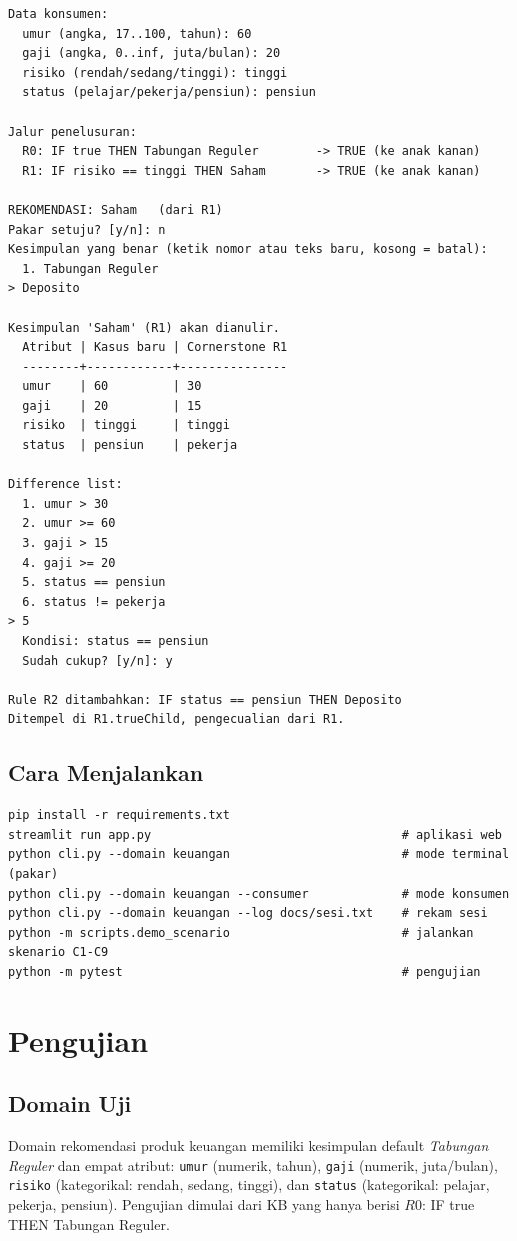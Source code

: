 \documentclass[11pt,a4paper]{article}
\begin{document}
\begin{lstlisting}
Data konsumen:
  umur (angka, 17..100, tahun): 60
  gaji (angka, 0..inf, juta/bulan): 20
  risiko (rendah/sedang/tinggi): tinggi
  status (pelajar/pekerja/pensiun): pensiun

Jalur penelusuran:
  R0: IF true THEN Tabungan Reguler        -> TRUE (ke anak kanan)
  R1: IF risiko == tinggi THEN Saham       -> TRUE (ke anak kanan)

REKOMENDASI: Saham   (dari R1)
Pakar setuju? [y/n]: n
Kesimpulan yang benar (ketik nomor atau teks baru, kosong = batal):
  1. Tabungan Reguler
> Deposito

Kesimpulan 'Saham' (R1) akan dianulir.
  Atribut | Kasus baru | Cornerstone R1
  --------+------------+---------------
  umur    | 60         | 30
  gaji    | 20         | 15
  risiko  | tinggi     | tinggi
  status  | pensiun    | pekerja

Difference list:
  1. umur > 30
  2. umur >= 60
  3. gaji > 15
  4. gaji >= 20
  5. status == pensiun
  6. status != pekerja
> 5
  Kondisi: status == pensiun
  Sudah cukup? [y/n]: y

Rule R2 ditambahkan: IF status == pensiun THEN Deposito
Ditempel di R1.trueChild, pengecualian dari R1.
\end{lstlisting}

\subsection{Cara Menjalankan}
\begin{lstlisting}
pip install -r requirements.txt
streamlit run app.py                                   # aplikasi web
python cli.py --domain keuangan                        # mode terminal (pakar)
python cli.py --domain keuangan --consumer             # mode konsumen
python cli.py --domain keuangan --log docs/sesi.txt    # rekam sesi
python -m scripts.demo_scenario                        # jalankan skenario C1-C9
python -m pytest                                       # pengujian
\end{lstlisting}

\section{Pengujian}

\subsection{Domain Uji}
Domain rekomendasi produk keuangan memiliki kesimpulan default \emph{Tabungan Reguler} dan
empat atribut: \texttt{umur} (numerik, tahun), \texttt{gaji} (numerik, juta/bulan),
\texttt{risiko} (kategorikal: rendah, sedang, tinggi), dan \texttt{status} (kategorikal:
pelajar, pekerja, pensiun). Pengujian dimulai dari KB yang hanya berisi
$R0$: IF true THEN Tabungan Reguler.
\end{document}
